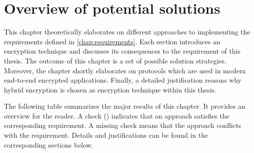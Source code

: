 \documentclass[../main.tex]{subfiles}
\begin{document}
\chapter{Overview of potential solutions}
\label{chap:overview}

This chapter theoretically elaborates on different approaches to implementing the requirements defined in \cref{chap:requirements}.
Each section introduces an encryption technique and discusses its consequences to the requirement of this thesis.
The outcome of this chapter is a set of possible solution strategies.
Moreover, the chapter shortly elaborates on protocols which are used in modern end-to-end encrypted applications. 
Finally, a detailed justification reasons why hybrid encryption is chosen as encryption technique within this thesis.

The following table summarizes the major results of this chapter.
It provides an overview for the reader.
A check (\checkmark) indicates that an approach satisfies the corresponding requirement.
A missing check means that the approach conflicts with the requirement.
Details and justifications can be found in the corresponding sections below.
\end{document}
